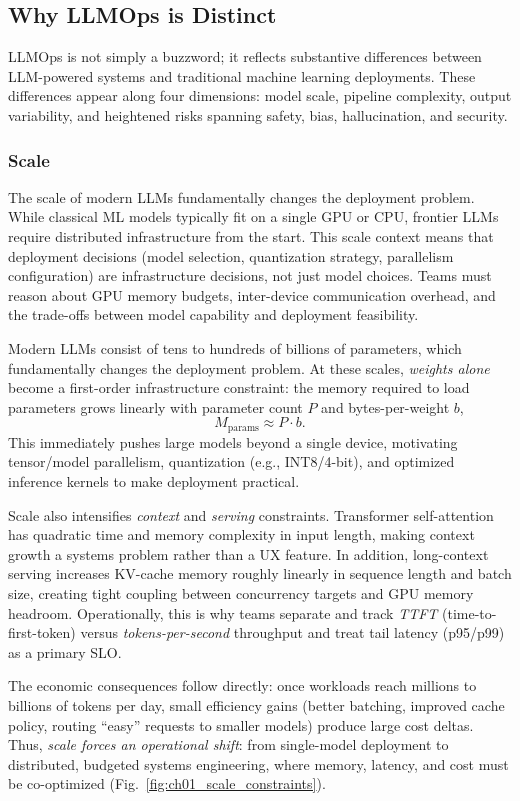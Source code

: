 \subsection{Why LLMOps is Distinct}\label{sec:why-llmops-distinct}
LLMOps is not simply a buzzword; it reflects substantive differences between LLM-powered systems and traditional machine learning deployments. These differences appear along four dimensions: model scale, pipeline complexity, output variability, and heightened risks spanning safety, bias, hallucination, and security.

\subsubsection{Scale}\label{sec:llmops-scale}
The scale of modern LLMs fundamentally changes the deployment problem. While classical ML models typically fit on a single GPU or CPU, frontier LLMs require distributed infrastructure from the start. This scale context means that deployment decisions (model selection, quantization strategy, parallelism configuration) are infrastructure decisions, not just model choices. Teams must reason about GPU memory budgets, inter-device communication overhead, and the trade-offs between model capability and deployment feasibility.

Modern LLMs consist of tens to hundreds of billions of parameters, which fundamentally changes the deployment
problem. At these scales, \emph{weights alone} become a first-order infrastructure constraint: the memory required
to load parameters grows linearly with parameter count $P$ and bytes-per-weight $b$,
\[
M_{\text{params}} \approx P \cdot b.
\]
This immediately pushes large models beyond a single device, motivating tensor/model parallelism, quantization
(e.g., INT8/4-bit), and optimized inference kernels to make deployment practical.

Scale also intensifies \emph{context} and \emph{serving} constraints. Transformer self-attention has quadratic time and
memory complexity in input length, making context growth a systems problem rather than a UX feature.
In addition, long-context serving increases KV-cache memory roughly linearly in sequence length and batch size,
creating tight coupling between concurrency targets and GPU memory headroom. Operationally, this is why teams
separate and track \emph{TTFT} (time-to-first-token) versus \emph{tokens-per-second} throughput and treat tail latency
(p95/p99) as a primary SLO.

The economic consequences follow directly: once workloads reach millions to billions of tokens per day, small
efficiency gains (better batching, improved cache policy, routing ``easy'' requests to smaller models) produce large
cost deltas. Thus, \emph{scale forces an operational shift}: from single-model deployment to distributed, budgeted
systems engineering, where memory, latency, and cost must be co-optimized (Fig.~\ref{fig:ch01_scale_constraints}).

